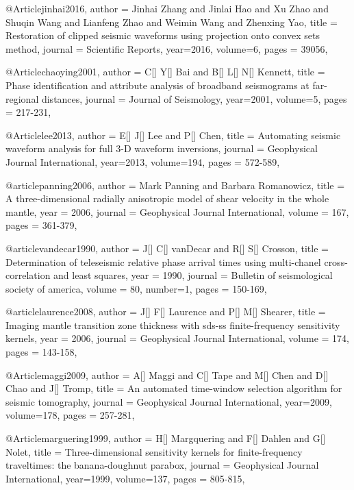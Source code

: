 @Article{jinhai2016,
  author =	 {Jinhai Zhang and Jinlai Hao and Xu Zhao and Shuqin Wang and Lianfeng Zhao and Weimin Wang and Zhenxing Yao},
  title =	 {Restoration of clipped seismic waveforms using projection onto convex sets method},
  journal =	 {Scientific Reports},
  year=2016,
  volume=6,
  pages =	 {39056},
}

@Article{chaoying2001,
  author =	 {C[] Y[] Bai and B[] L[] N[] Kennett},
  title =	 {Phase identification and attribute analysis of broadband seismograms at far-regional distances},
  journal =	 {Journal of Seismology},
  year=2001,
  volume=5,
  pages =	 {217-231},
}



@Article{lee2013,
  author =	 {E[] J[] Lee and P[] Chen},
  title =	 {Automating seismic waveform analysis for full 3-{D} waveform inversions},
  journal =	 {Geophysical Journal International},
  year=2013,
  volume=194,
  pages =	 {572-589},
}

@article{panning2006,
author = {Mark Panning and Barbara Romanowicz},
title = {A three-dimensional radially anisotropic model of shear velocity
in the whole mantle},
year = {2006},
journal = {Geophysical Journal International},
volume = {167},
pages = {361-379},
}

@article{vandecar1990,
author = {J[] C[] vanDecar and R[] S[] Crosson},
title = {Determination of teleseismic relative phase arrival times using multi-chanel cross-correlation and least squares},
year = {1990},
journal = {Bulletin of seismological society of america},
volume = {80},
number=1,
pages = {150-169},
}

@article{laurence2008,
author = {J[] F[] Laurence and P[] M[] Shearer},
title = {Imaging mantle transition zone thickness with sds-ss finite-frequency sensitivity kernels},
year = {2006},
journal = {Geophysical Journal International},
volume = {174},
pages = {143-158},
}



@Article{maggi2009,
  author =	 {A[] Maggi and C[] Tape and M[] Chen and D[] Chao and J[] Tromp},
  title =	 {An automated time-window selection algorithm for seismic tomography},
  journal =	 {Geophysical Journal International},
  year=2009,
  volume=178,
  pages =	 {257-281},
}

@Article{marguering1999,
  author =	 {H[] Margquering and F[] Dahlen and G[] Nolet},
  title =	 {Three-dimensional sensitivity kernels for finite-frequency traveltimes: the banana-doughnut parabox},
  journal =	 {Geophysical Journal International},
  year=1999,
  volume=137,
  pages =	 {805-815},
}


